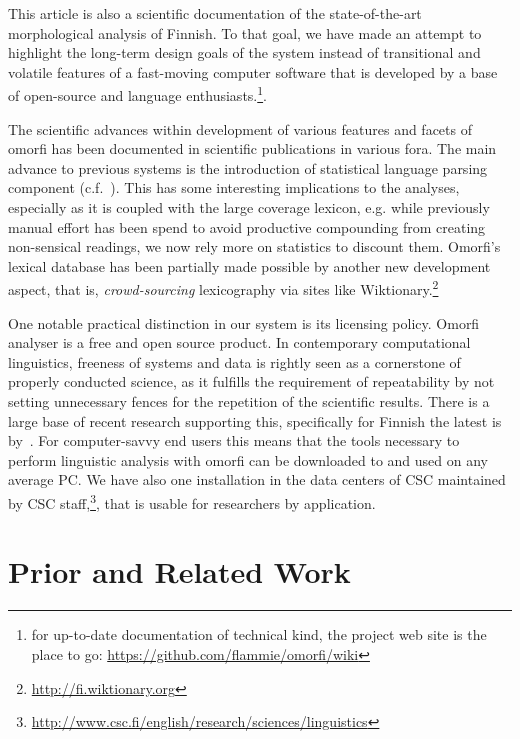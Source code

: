 \documentclass[a4paper,12pt]{article}
\begin{document}
This article is also a scientific documentation of the state-of-the-art
morphological analysis of Finnish. To that goal, we have made an attempt to
highlight the long-term design goals of the system instead of transitional
and volatile features of a fast-moving computer software that is developed
by a base of open-source and language enthusiasts.\footnote{for up-to-date
documentation of technical kind, the project web site is the place to go:
\url{https://github.com/flammie/omorfi/wiki}}.

The scientific advances within development of various features and facets of
omorfi has been documented in scientific publications in various fora. The
main advance to previous systems is the introduction of statistical language
parsing component (c.f.~\citet[for basic introduction]{manning}). This has
some interesting implications to the analyses, especially as it is coupled
with the large coverage lexicon, e.g. while previously manual effort has
been spend to avoid productive compounding from creating non-sensical
readings, we now rely more on statistics to discount them. Omorfi's lexical
database has been partially made possible by another new development aspect,
that is, \textit{crowd-sourcing} lexicography via sites like
Wiktionary.\footnote{\url{http://fi.wiktionary.org}}

One notable practical distinction in our system is its licensing policy. Omorfi
analyser is a free and open source product.  In contemporary computational
linguistics, freeness of systems and data is rightly seen as a cornerstone of
properly conducted science, as it fulfills the requirement of repeatability by
not setting unnecessary fences for the repetition of the scientific results.
There is a large base of recent research supporting this, specifically for
Finnish the latest is by~\citet{koskenniemi2008build}. For computer-savvy end
users this means that the tools necessary to perform linguistic analysis with
omorfi can be downloaded to and used on any average PC. We have also one
installation in the data centers of CSC maintained by CSC
staff,\footnote{\url{http://www.csc.fi/english/research/sciences/linguistics}},
that is usable for researchers by application.

\section{Prior and Related Work}
\label{sec:prior-work}
\end{document}
